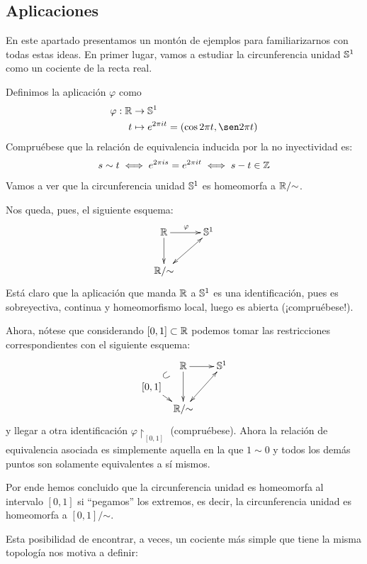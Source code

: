 \subsection{Aplicaciones}
En este apartado presentamos un montón de ejemplos para familiarizarnos con todas estas ideas. En primer lugar, vamos a estudiar la circunferencia unidad $\mathbb{S}^1$ como un cociente de la recta real.
\begin{exa}
	Definimos la aplicación $\varphi$ como
	\[\begin{split}
	\varphi:\R&\to\esfera^1 \\
	t&\mapsto e^{2\pi it}=(\cos 2\pi t,\sen 2\pi t)
	\end{split}\]
	Compruébese que la relación de equivalencia inducida por la no inyectividad es:
	\[s\sim t\iff e^{2\pi is}=e^{2\pi it}\iff s-t\in\mathbb{Z}\]
	Vamos a ver que la circunferencia unidad $\mathbb{S}^1$ es homeomorfa a $\mathbb{R}/\mathord{\sim}$.
	
	Nos queda, pues, el siguiente esquema:
	\[\xymatrix{
		\R \ar[r]^\varphi \ar[d] &
		\esfera^1 \\
		\R/\mathord{\sim}  \ar@{<->}[ru]
	}\]
	Está claro que la aplicación que manda $\mathbb{R}$ a $\mathbb{S}^1$ es una identificación, pues es sobreyectiva, continua y homeomorfismo local, luego es abierta (¡compruébese!).
	
	Ahora, nótese que considerando $[0,1]\subset\mathbb{R}$ podemos tomar las restricciones correspondientes con el siguiente esquema:
	\[\xymatrix @C=0.5pc @R=0.5pc @L=-0.2pc {
		& \R \ar[rr] \ar[dd] & &
		\esfera^1 \\
		[0,1] \ar@{}[ur]^*[@]{\subset} \ar[dr] \\
		& \R/\mathord{\sim}  \ar@{<->}[rruu]
	}\]
	y llegar a otra identificación $\varphi\restriction_{[0,1]}$ (compruébese). Ahora la relación de equivalencia asociada es simplemente aquella en la que $1\sim 0$ y todos los demás puntos son solamente equivalentes a sí mismos.
	
	Por ende hemos concluido que la circunferencia unidad es homeomorfa al intervalo $[0,1]$ si ``pegamos'' los extremos, es decir, la circunferencia unidad es homeomorfa a $[0,1]/\mathord{\sim}$.
\end{exa}

Esta posibilidad de encontrar, a veces, un cociente más simple que tiene la misma topología nos motiva a definir:

